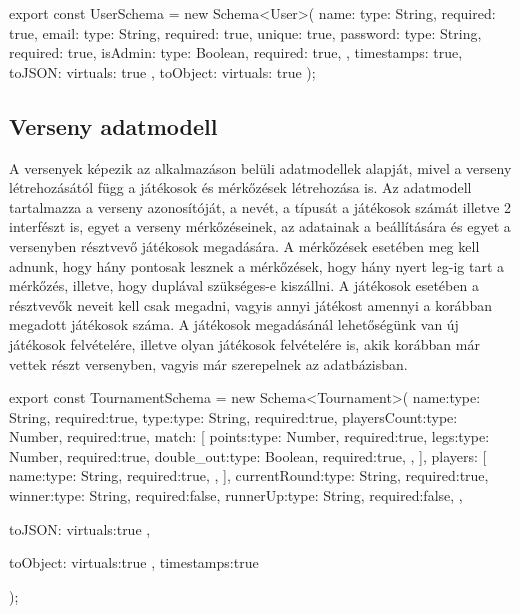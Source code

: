 \begin{cpp}
export const UserSchema = new Schema<User>({
    name: {type: String, required: true},
    email: {type: String, required: true, unique: true},
    password: {type: String, required: true},
    isAdmin: {type: Boolean, required: true},
}, {
    timestamps: true,
    toJSON:{
        virtuals: true
    },
    toObject:{
        virtuals: true
    }
});
\end{cpp}

\subsection{Verseny adatmodell}
A versenyek képezik az alkalmazáson belüli adatmodellek alapját, mivel a verseny létrehozásától függ a játékosok és mérkőzések létrehozása is. Az adatmodell tartalmazza a verseny azonosítóját, a nevét, a típusát a játékosok számát illetve 2 interfészt is, egyet a verseny mérkőzéseinek, az adatainak a beállítására és egyet a versenyben résztvevő játékosok megadására. A mérkőzések esetében meg kell adnunk, hogy hány pontosak lesznek a mérkőzések, hogy hány nyert leg-ig tart a mérkőzés, illetve, hogy duplával szükséges-e kiszállni. A játékosok esetében a résztvevők neveit kell csak megadni, vagyis annyi játékost amennyi a korábban megadott játékosok száma. A játékosok megadásánál lehetőségünk van új játékosok felvételére, illetve olyan játékosok felvételére is, akik korábban már vettek részt versenyben, vagyis már szerepelnek az adatbázisban.

\begin{cpp}
export const TournamentSchema = new Schema<Tournament>(
    {
        name:{type: String, required:true},
        type:{type: String, required:true},
        playersCount:{type: Number, required:true},
        match:
        [
            {
                points:{type: Number, required:true},
                legs:{type: Number, required:true},
                double_out:{type: Boolean, required:true},
            },
        ],
        players:
        [
            {
                name:{type: String, required:true},
            },
        ],
        currentRound:{type: String, required:true},
        winner:{type: String, required:false},
        runnerUp:{type: String, required:false},
    },{
        toJSON:{
            virtuals:true
        },

        toObject:{
            virtuals:true
        },
        timestamps:true
    }
);
\end{cpp}

